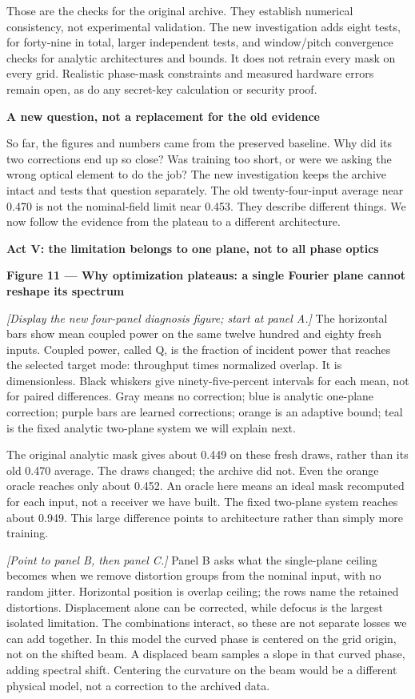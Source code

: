 \documentclass[11pt,letterpaper]{article}
\newcommand{\cue}[1]{\par\textbf{#1}\par}
\newcommand{\stage}[1]{\textit{[#1]}}
\begin{document}
Those are the checks for the original archive. They establish numerical consistency, not experimental validation. The new investigation adds eight tests, for forty-nine in total, larger independent tests, and window/pitch convergence checks for analytic architectures and bounds. It does not retrain every mask on every grid. Realistic phase-mask constraints and measured hardware errors remain open, as do any secret-key calculation or security proof.

\cue{A new question, not a replacement for the old evidence}
So far, the figures and numbers came from the preserved baseline. Why did its two corrections end up so close? Was training too short, or were we asking the wrong optical element to do the job? The new investigation keeps the archive intact and tests that question separately. The old twenty-four-input average near 0.470 is not the nominal-field limit near 0.453. They describe different things. We now follow the evidence from the plateau to a different architecture.

\newpage
\cue{Act V: the limitation belongs to one plane, not to all phase optics}
\cue{Figure 11 --- Why optimization plateaus: a single Fourier plane cannot reshape its spectrum}
\stage{Display the new four-panel diagnosis figure; start at panel A.}
The horizontal bars show mean coupled power on the same twelve hundred and eighty fresh inputs. Coupled power, called Q, is the fraction of incident power that reaches the selected target mode: throughput times normalized overlap. It is dimensionless. Black whiskers give ninety-five-percent intervals for each mean, not for paired differences. Gray means no correction; blue is analytic one-plane correction; purple bars are learned corrections; orange is an adaptive bound; teal is the fixed analytic two-plane system we will explain next.

The original analytic mask gives about 0.449 on these fresh draws, rather than its old 0.470 average. The draws changed; the archive did not. Even the orange oracle reaches only about 0.452. An oracle here means an ideal mask recomputed for each input, not a receiver we have built. The fixed two-plane system reaches about 0.949. This large difference points to architecture rather than simply more training.

\stage{Point to panel B, then panel C.}
Panel B asks what the single-plane ceiling becomes when we remove distortion groups from the nominal input, with no random jitter. Horizontal position is overlap ceiling; the rows name the retained distortions. Displacement alone can be corrected, while defocus is the largest isolated limitation. The combinations interact, so these are not separate losses we can add together. In this model the curved phase is centered on the grid origin, not on the shifted beam. A displaced beam samples a slope in that curved phase, adding spectral shift. Centering the curvature on the beam would be a different physical model, not a correction to the archived data.
\end{document}
